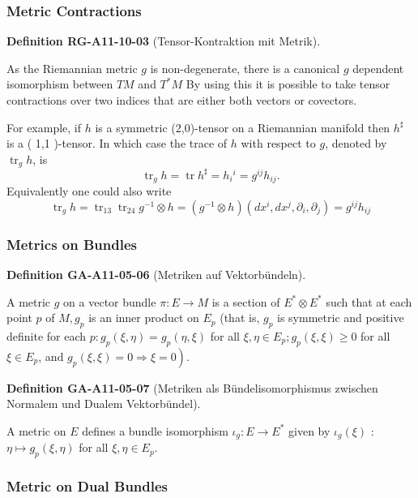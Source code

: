\documentclass[10pt, letterpaper]{article}
\newcommand{\CustomHeading}[3]{%
  \par\medskip\noindent%
  \textbf{#1 #2} \textnormal{(#3)}.\enskip%
}
\newenvironment{DEF}[2]{\begin{unitbox}\CustomHeading{Definition}{#1}{#2}}{\end{unitbox}}
\begin{document}
\subsubsection*{Metric Contractions}


\begin{DEF}{RG-A11-10-03}{Tensor-Kontraktion mit Metrik}
As the Riemannian metric $g$ is non-degenerate, there is a canonical $g$ dependent isomorphism between $T M$ and $T^{*}M$ By using this it is possible to take tensor contractions over two indices that are either both vectors or covectors.

For example, if $h$ is a symmetric (2,0)-tensor on a Riemannian manifold then $h^{\sharp}$ is a ( 1,1 )-tensor. In which case the trace of $h$ with respect to $g$, denoted by $\operatorname{tr}_{g} h$, is
$$
\operatorname{tr}_{g} h=\operatorname{tr} h^{\sharp}=h_{i}{ }^{i}=g^{i j} h_{i j} .
$$
Equivalently one could also write
$$
\operatorname{tr}_{g} h=\operatorname{tr}_{13} \operatorname{tr}_{24} g^{-1} \otimes h=\left(g^{-1} \otimes h\right)\left(d x^{i}, d x^{j}, \partial_{i}, \partial_{j}\right)=g^{i j} h_{i j}
$$
\end{DEF}





\subsubsection*{Metrics on Bundles}


\begin{DEF}{GA-A11-05-06}{Metriken auf Vektorbündeln}
A metric $g$ on a vector bundle $\pi: E \rightarrow M$ is a section of $E^{*} \otimes E^{*}$ such that at each point $p$ of $M, g_{p}$ is an inner product on $E_{p}$ (that is, $g_{p}$ is symmetric and positive definite for each $p: g_{p}(\xi, \eta)=g_{p}(\eta, \xi)$ for all $\xi, \eta \in E_{p} ; g_{p}(\xi, \xi) \geq 0$ for all $\xi \in E_{p}$, and $\left.g_{p}(\xi, \xi)=0 \Rightarrow \xi=0\right)$.
\end{DEF}

\begin{DEF}{GA-A11-05-07}{Metriken als Bündelisomorphismus zwischen Normalem und Dualem Vektorbündel}
A metric on $E$ defines a bundle isomorphism $\iota_{g}: E \rightarrow E^{*}$ given by $\iota_{g}(\xi)$ : $\eta \mapsto g_{p}(\xi, \eta)$ for all $\xi, \eta \in E_{p}$.
\end{DEF}

\subsubsection*{Metric on Dual Bundles}
\end{document}
